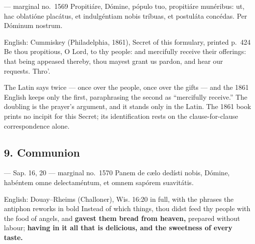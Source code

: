 \begin{appointedlatin}{ --- marginal no.\ 1569}
Propitiáre, Dómine, pópulo tuo, propitiáre munéribus: ut, hac oblatióne
placátus, et indulgéntiam nobis tríbuas, et postuláta concédas. Per Dóminum
nostrum.
\end{appointedlatin}

\begin{namedtranslation}{English: Cummiskey (Philadelphia, 1861), Secret of this formulary, printed p.~424}
Be thou propitious, O Lord, to thy people: and mercifully receive their
offerings: that being appeased thereby, thou mayest grant us pardon, and hear
our requests. Thro'.
\end{namedtranslation}

The Latin says  twice --- once over the people, once over the
gifts --- and the 1861 English keeps only the first, paraphrasing the second as
``mercifully receive.'' The doubling is the prayer's argument, and it stands
only in the Latin. The 1861 book prints no incipit for this Secret; its
identification rests on the clause-for-clause correspondence alone.


\elementguard
\subsection*{9. Communion }

\begin{appointedlatin}{ --- Sap. 16, 20 --- marginal no.\ 1570}
Panem de cælo dedísti nobis, Dómine, habéntem omne delectaméntum, et omnem
sapórem suavitátis.
\end{appointedlatin}

\begin{namedtranslation}{English: Douay--Rheims (Challoner), Wis. 16:20 in full, with the phrases the antiphon reworks in bold}
Instead of which things, thou didst feed thy people with the food of angels,
and \textbf{gavest them bread from heaven,} prepared without labour;
\textbf{having in it all that is delicious, and the sweetness of every taste.}
\end{namedtranslation}


